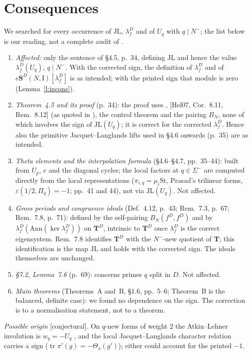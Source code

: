 \documentclass[11pt]{amsart}
\theoremstyle{plain}
\theoremstyle{remark}
\newcommand{\I}{\mathrm{I}}
\newcommand{\T}{\mathbf{T}}
\newcommand{\JL}{\mathrm{JL}}
\newcommand{\St}{\mathrm{St}}
\newcommand{\eS}{e\mathbf{S}}
\newcommand{\st}[1]{\textup{\textsf{[#1]}}}
\begin{document}
\section{Consequences}\label{s:cons}
We searched \cite{Hs} for every occurrence of $\JL$, $\lambda^D_f$ and of $U_q$ with $q\mid N^-$; the list below is our
reading, not a complete audit of \cite{Hs}.
\begin{enumerate}[label=(\arabic*)]
\item \emph{Affected:} only the sentence of \S4.5, p.~34, defining $\JL$ and hence the value $\lambda^D_f(U_q)$,
  $q\mid N^-$. With the corrected sign, the definition of $\lambda^D_f$ and of $\eS^D(N,\I)[\lambda^D_f]$ is as intended;
  with the printed sign that module is zero (Lemma~\ref{l:incons}).
\item \emph{Theorem~4.5 and its proof} (p.~34): the proof uses \cite[Thm.~2.1]{Wiles}, [Hel07, Cor.~8.11, Rem.~8.12]
  (as quoted in \cite{Hs}), the control theorem and the pairing $B_N$, none of which involves the sign of $\JL(U_q)$; it is correct for the corrected
  $\lambda^D_f$. Hence also the primitive Jacquet--Langlands lifts used in \S4.6 onwards (p.~35) are as intended.
\item \emph{Theta elements and the interpolation formula} (\S4.6--\S4.7, pp.~35--44): built from $U_p$, $e$ and the
  diagonal cycles; the local factors at $q\in\Sigma^-$ are computed directly from the local representations
  ($\pi_{i,q}=\mu_i\St$, Prasad's trilinear forms, $\varepsilon(1/2,\Pi_q)=-1$; pp.~41 and 44), not via $\JL(U_q)$.
  Not affected.
\item \emph{Gross periods and congruence ideals} (Def.~4.12, p.~43; Rem.~7.3, p.~67; Rem.~7.8, p.~71): defined by the
  self-pairing $B_N(f^D,f^D)$ and by $\lambda^D_f(\mathrm{Ann}(\ker\lambda^D_f))$ on $\T^D$, intrinsic to $\T^D$ once
  $\lambda^D_f$ is the correct eigensystem. Rem.~7.8 identifies $\T^D$ with the $N^-$-new quotient of $\T$; this
  identification is the map $\JL$ and holds with the corrected sign. The ideals themselves are unchanged.
\item \emph{\S7.2, Lemma~7.6} (p.~69): concerns primes $q$ split in $D$. Not affected.
\item \emph{Main theorems} (Theorems~A and~B, \S1.6, pp.~5--6; Theorem~B is the balanced, definite case): we
  found no dependence on the sign. The
  correction is to a normalisation statement, not to a theorem.
\end{enumerate}
\emph{Possible origin} \st{conjectural}. On $q$-new forms of weight $2$ the Atkin--Lehner involution is $w_q=-U_q$
\cite[Prop.~3.7, p.~445]{Rib}, and the local Jacquet--Langlands character relation carries a sign
($\operatorname{tr}\pi'(g)=-\Theta_\pi(g')$); either could account for the printed $-1$.
\end{document}
